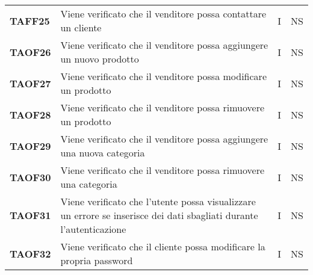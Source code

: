 \begin{center}
\begin{longtable}[!h]{p{60px} p{240px} p{35px} p{35px}}
        \textbf{TAFF25} & Viene verificato che il venditore possa contattare un cliente                                                        & I             & NS              \\
        \textbf{TAOF26} & Viene verificato che il venditore possa aggiungere un nuovo prodotto                                                 & I             & NS              \\
        \textbf{TAOF27} & Viene verificato che il venditore possa modificare un prodotto                                                       & I             & NS              \\
        \textbf{TAOF28} & Viene verificato che il venditore possa rimuovere un prodotto                                                        & I             & NS              \\
        \textbf{TAOF29} & Viene verificato che il venditore possa aggiungere una nuova categoria                                               & I             & NS              \\
        \textbf{TAOF30} & Viene verificato che il venditore possa rimuovere una categoria                                                      & I             & NS              \\
        \textbf{TAOF31} & Viene verificato che l'utente possa visualizzare un errore se inserisce dei dati sbagliati durante l'autenticazione  & I             & NS              \\
        \textbf{TAOF32} & Viene verificato che il cliente possa modificare la propria password                                                 & I             & NS              \\
    \end{longtable}
\end{center}